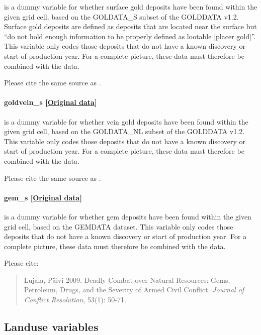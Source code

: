 \documentclass[]{book}
\begin{document}
is a dummy variable for whether surface gold deposits have been found
within the given grid cell, based on the GOLDATA\_S subset of the
GOLDDATA v1.2. Surface gold deposits are defined as deposits that are
located near the surface but ``do not hold enough information to be
properly defined as lootable {[}placer gold{]}''. This variable only
codes those deposits that do not have a known discovery or start of
production year. For a complete picture, these data must therefore be
combined with the  data.

Please cite the same source as .

\paragraph{goldvein\_s
{[}\href{http://www.researchgate.net/profile/Sara_Balestri}{Original
data}{]}}\label{goldvein-s}

is a dummy variable for whether vein gold deposits have been found
within the given grid cell, based on the GOLDATA\_NL subset of the
GOLDDATA v1.2. This variable only codes those deposits that do not have
a known discovery or start of production year. For a complete picture,
these data must therefore be combined with the 
data.

Please cite the same source as .

\paragraph{gem\_s
{[}\href{http://paivilujala.weebly.com/gemdata.html}{Original
data}{]}}\label{gem-s}

is a dummy variable for whether gem deposits have been found within the
given grid cell, based on the GEMDATA dataset. This variable only codes
those deposits that do not have a known discovery or start of production
year. For a complete picture, these data must therefore be combined with
the  data.

Please cite:

\begin{quote}
Lujala, Päivi 2009. Deadly Combat over Natural Resources: Gems,
Petroleum, Drugs, and the Severity of Armed Civil Conflict.
\emph{Journal of Conflict Resolution}, 53(1): 50-71.
\end{quote}

\subsection{Landuse variables}\label{landuse-variables}
\end{document}
